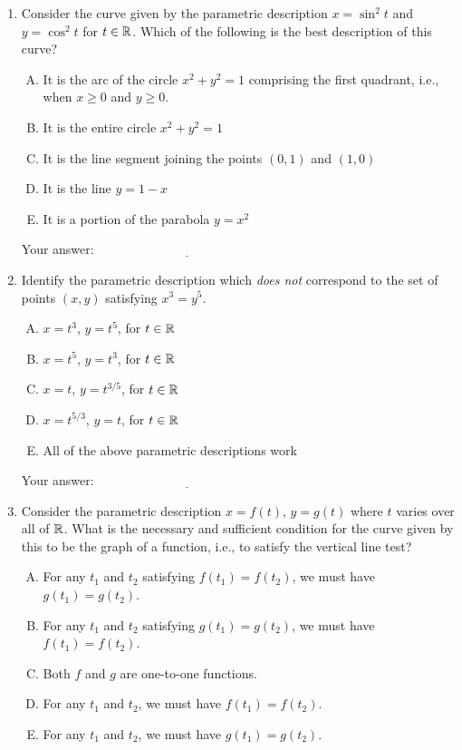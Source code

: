 \documentclass[10pt]{amsart}
\begin{document}
\begin{enumerate}
\item Consider the curve given by the parametric description $x =
  \sin^2t$ and $y = \cos^2t$ for $t \in \mathbb{R}$. Which of the
  following is the best description of this curve?

  \begin{enumerate}[(A)]
  \item It is the arc of the circle $x^2 + y^2 = 1$ comprising the
    first quadrant, i.e., when $x \ge 0$ and $y \ge 0$.
  \item It is the entire circle $x^2 + y^2 = 1$
  \item It is the line segment joining the points $(0,1)$ and $(1,0)$
  \item It is the line $y = 1 - x$
  \item It is a portion of the parabola $y = x^2$
  \end{enumerate}

  \vspace{0.1in}
  Your answer: $\underline{\qquad\qquad\qquad\qquad\qquad\qquad\qquad}$
  \vspace{0.6in}

\item Identify the parametric description which {\em does not}
  correspond to the set of points $(x,y)$ satisfying $x^3 = y^5$.

  \begin{enumerate}[(A)]
  \item $x = t^3$, $y = t^5$, for $t \in \mathbb{R}$
  \item $x = t^5$, $y = t^3$, for $t \in \mathbb{R}$
  \item $x = t$, $y = t^{3/5}$, for $t \in \mathbb{R}$
  \item $x = t^{5/3}$, $y = t$, for $t \in \mathbb{R}$
  \item All of the above parametric descriptions work
  \end{enumerate}

  \vspace{0.1in}
  Your answer: $\underline{\qquad\qquad\qquad\qquad\qquad\qquad\qquad}$
  \vspace{0.6in}

\item Consider the parametric description $x = f(t)$, $y = g(t)$ where
  $t$ varies over all of $\mathbb{R}$. What is the necessary and sufficient
  condition for the curve given by this to be the graph of a function,
  i.e., to satisfy the vertical line test?

  \begin{enumerate}[(A)]
  \item For any $t_1$ and $t_2$ satisfying $f(t_1) = f(t_2)$, we must
    have $g(t_1) = g(t_2)$.
  \item For any $t_1$ and $t_2$ satisfying $g(t_1) = g(t_2)$, we must
    have $f(t_1) = f(t_2)$.
  \item Both $f$ and $g$ are one-to-one functions.
  \item For any $t_1$ and $t_2$, we must have $f(t_1) = f(t_2)$.
  \item For any $t_1$ and $t_2$, we must have $g(t_1) = g(t_2)$.
  \end{enumerate}


\end{enumerate}
\end{document}
